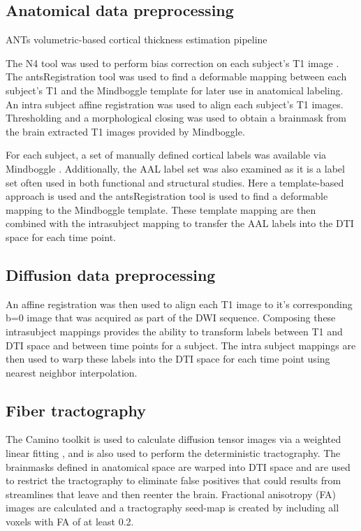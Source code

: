 \documentclass{frontiersSCNS} %
\begin{document}
\subsection{Anatomical data preprocessing}
ANTs volumetric-based cortical thickness estimation pipeline

The N4 tool was used to perform bias correction on each subject's T1
image \citep{Tustison????}. The antsRegistration tool was used to find
a deformable mapping between each subject's T1 and the Mindboggle
template for later use in anatomical labeling. An intra subject affine
registration was used to align each subject's T1 images. Thresholding
and a morphological closing was
used to obtain a brainmask from the brain extracted T1 images provided
by Mindboggle. 

For each subject, a set of manually defined cortical labels was
available via Mindboggle \citep{Klein2012}. Additionally, the AAL label set
\citep{Tzourio-Mazoyer2002} was also examined
as it is a label set often used in both functional and structural
studies. Here a template-based approach is used and the
antsRegistration tool is used to find a deformable mapping to the
Mindboggle template. These template mapping are then combined with the
intrasubject mapping to transfer the AAL labels into the DTI space for
each time point.

\subsection{Diffusion data preprocessing}
An affine registration was then used to align each T1
image to it's corresponding b=0 image that was acquired as part of the
DWI sequence. Composing these intrasubject mappings provides the
ability to transform labels between T1 and DTI space and between time
points for a subject.  The intra subject mappings
are then used to warp these labels into the DTI space for each time
point using nearest neighbor interpolation.

\subsection{Fiber tractography}
The Camino toolkit \citep{} is used to calculate diffusion tensor images via a
weighted linear fitting \citep{Basser1994,Salvador2005}, and is also
used to perform the deterministic tractography. The brainmasks defined
in anatomical space are warped into DTI space and are used to restrict the
tractography to eliminate false positives that could results from
streamlines that leave and then reenter the brain. Fractional anisotropy (FA) images are calculated and a
tractography seed-map is created by including all voxels with FA of at
least 0.2.
\end{document}
